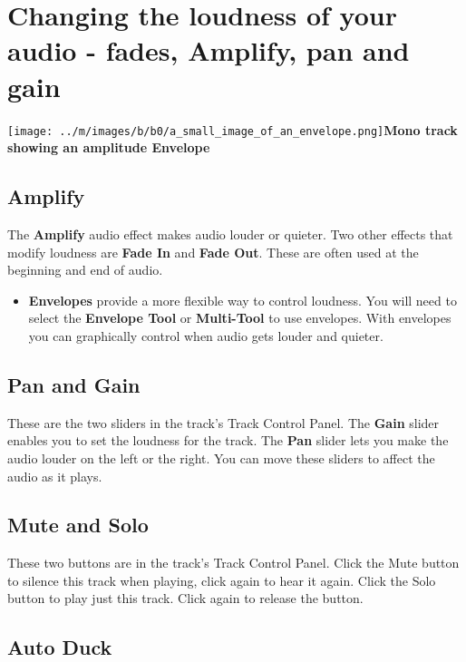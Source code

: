 \documentclass[twocolumn]{book}
\begin{document}

\section{Changing the loudness of your audio - fades, Amplify, pan and gain}

\par\texttt{[image: ../m/images/b/b0/a\_small\_image\_of\_an\_envelope.png]}\textbf{Mono track showing an amplitude Envelope}

\subsection{Amplify}


The \textbf{Amplify} audio effect makes audio louder or quieter.  Two other effects that modify loudness are \textbf{Fade In} and \textbf{Fade Out}.  These are often used at the beginning and end of audio. 
\begin{itemize}
\item  \textbf{Envelopes} provide a more flexible way to control loudness.  You will need to select the \textbf{Envelope Tool} or \textbf{Multi-Tool} to use envelopes.  With envelopes you can graphically control when audio gets louder and quieter.
\end{itemize}

\subsection{Pan and Gain}


These are the two sliders in the track's Track Control Panel. The \textbf{Gain} slider enables you to set the loudness for the track.  The \textbf{Pan} slider lets you make the audio louder on the left or the right. You can move these sliders to affect the audio as it plays.

\subsection{Mute and Solo}


These two buttons are in the track's Track Control Panel. Click the Mute button to silence this track when playing, click again to hear it again. Click the Solo button to play just this track. Click again to release the button. 

\subsection{Auto Duck}
\end{document}
